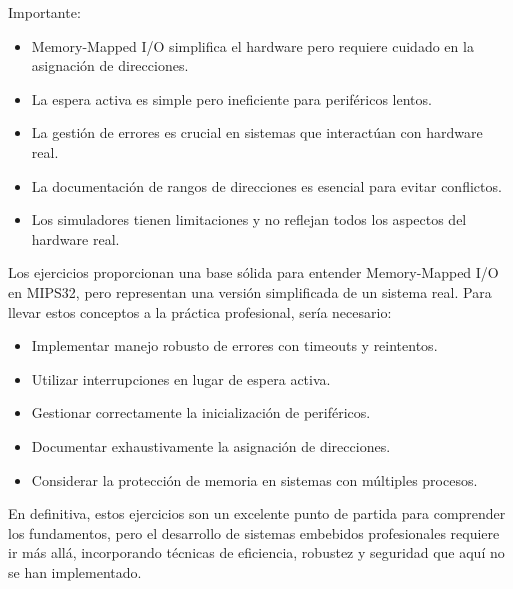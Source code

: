 \documentclass{article}
\begin{document}
Importante:
\begin{itemize}
    \item Memory-Mapped I/O simplifica el hardware pero requiere cuidado en la asignación de direcciones.

    \item La espera activa es simple pero ineficiente para periféricos lentos.

    \item La gestión de errores es crucial en sistemas que interactúan con hardware real.

    \item La documentación de rangos de direcciones es esencial para evitar conflictos.

    \item Los simuladores tienen limitaciones y no reflejan todos los aspectos del hardware real.
\end{itemize}
Los ejercicios proporcionan una base sólida para entender Memory-Mapped I/O en MIPS32, pero representan una versión simplificada de un sistema real. Para llevar estos conceptos a la práctica profesional, sería necesario:
\begin{itemize}
    \item Implementar manejo robusto de errores con timeouts y reintentos.
    \item Utilizar interrupciones en lugar de espera activa.
    \item Gestionar correctamente la inicialización de periféricos.
    \item Documentar exhaustivamente la asignación de direcciones.
    \item Considerar la protección de memoria en sistemas con múltiples procesos.
\end{itemize}
En definitiva, estos ejercicios son un excelente punto de partida para comprender los fundamentos, pero el desarrollo de sistemas embebidos profesionales requiere ir más allá, incorporando técnicas de eficiencia, robustez y seguridad que aquí no se han implementado.
\\
\end{document}
